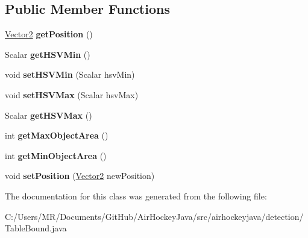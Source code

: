 \subsection*{Public Member Functions}
\begin{DoxyCompactItemize}
\item 
\hypertarget{classairhockeyjava_1_1detection_1_1_table_bound_af4186bf79020d58f88a397a82362802d}{}\hyperlink{classairhockeyjava_1_1util_1_1_vector2}{Vector2} {\bfseries get\+Position} ()\label{classairhockeyjava_1_1detection_1_1_table_bound_af4186bf79020d58f88a397a82362802d}

\item 
\hypertarget{classairhockeyjava_1_1detection_1_1_table_bound_ade79b95a295e6323758ca2b7f84d1856}{}Scalar {\bfseries get\+H\+S\+V\+Min} ()\label{classairhockeyjava_1_1detection_1_1_table_bound_ade79b95a295e6323758ca2b7f84d1856}

\item 
\hypertarget{classairhockeyjava_1_1detection_1_1_table_bound_a8a84256b5c1a0a4d0da2e9ae407f9f8a}{}void {\bfseries set\+H\+S\+V\+Min} (Scalar hsv\+Min)\label{classairhockeyjava_1_1detection_1_1_table_bound_a8a84256b5c1a0a4d0da2e9ae407f9f8a}

\item 
\hypertarget{classairhockeyjava_1_1detection_1_1_table_bound_a036aa4f370aa320fb8eef0b5e86c44c1}{}void {\bfseries set\+H\+S\+V\+Max} (Scalar hsv\+Max)\label{classairhockeyjava_1_1detection_1_1_table_bound_a036aa4f370aa320fb8eef0b5e86c44c1}

\item 
\hypertarget{classairhockeyjava_1_1detection_1_1_table_bound_a485aa18fa2112f7df100195308d5fff0}{}Scalar {\bfseries get\+H\+S\+V\+Max} ()\label{classairhockeyjava_1_1detection_1_1_table_bound_a485aa18fa2112f7df100195308d5fff0}

\item 
\hypertarget{classairhockeyjava_1_1detection_1_1_table_bound_af2e33511fbba601acb700b436dc5efab}{}int {\bfseries get\+Max\+Object\+Area} ()\label{classairhockeyjava_1_1detection_1_1_table_bound_af2e33511fbba601acb700b436dc5efab}

\item 
\hypertarget{classairhockeyjava_1_1detection_1_1_table_bound_af34d5abef2ca51e14fc15e36da72cc23}{}int {\bfseries get\+Min\+Object\+Area} ()\label{classairhockeyjava_1_1detection_1_1_table_bound_af34d5abef2ca51e14fc15e36da72cc23}

\item 
\hypertarget{classairhockeyjava_1_1detection_1_1_table_bound_a38467be2df88edaf31b6b58a9473b860}{}void {\bfseries set\+Position} (\hyperlink{classairhockeyjava_1_1util_1_1_vector2}{Vector2} new\+Position)\label{classairhockeyjava_1_1detection_1_1_table_bound_a38467be2df88edaf31b6b58a9473b860}

\end{DoxyCompactItemize}


The documentation for this class was generated from the following file\+:\begin{DoxyCompactItemize}
\item 
C\+:/\+Users/\+M\+R/\+Documents/\+Git\+Hub/\+Air\+Hockey\+Java/src/airhockeyjava/detection/Table\+Bound.\+java\end{DoxyCompactItemize}
